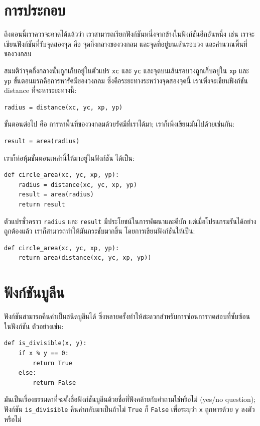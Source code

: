 \section{การประกอบ}%

ถึงตอนนี้เราควรจะคาดได้แล้วว่า เราสามารถเรียกฟังก์ชันหนึ่งจากข้างในฟังก์ชันอีกอันหนึ่ง เช่น 
เราจะเขียนฟังก์ชันที่รับจุดสองจุด คือ จุดกึ่งกลางของวงกลม และจุดที่อยู่บนเส้นรอบวง
และคำนวณพื้นที่ของวงกลม

สมมติว่าจุดกึ่งกลางนั้นถูกเก็บอยู่ในตัวแปร {\tt xc} และ {\tt yc} และจุดบนเส้นรอบวงถูกเก็บอยู่ใน
{\tt xp} และ {\tt yp} ขั้นตอนแรกคือการหารัศมีของวงกลม ซึ่งคือระยะทางระหว่างจุดสองจุดนี้
เราเพิ่งจะเขียนฟังก์ชัน distance ที่จะหาระยะทางนี้:

\begin{verbatim}
radius = distance(xc, yc, xp, yp)
\end{verbatim}
%
ขั้นตอนต่อไป คือ การหาพื้นที่ของวงกลมด้วยรัศมีที่เราได้มา; เราก็เพิ่งเขียนมันไปด้วยเช่นกัน:

\begin{verbatim}
result = area(radius)
\end{verbatim}
%
เราก็ห่อหุ้มขั้นตอนเหล่านี้ให้มาอยู่ในฟังก์ชัน ได้เป็น:

\begin{verbatim}
def circle_area(xc, yc, xp, yp):
    radius = distance(xc, yc, xp, yp)
    result = area(radius)
    return result
\end{verbatim}
%
ตัวแปรชั่วคราว {\tt radius} และ {\tt result} มีประโยชน์ในการพัฒนาและดีบัก
แต่เมื่อโปรแกรมรันได้อย่างถูกต้องแล้ว เราก็สามารถทำให้มันกระชับมากขึ้น โดยการเขียนฟังก์ชันให้เป็น:

\begin{verbatim}
def circle_area(xc, yc, xp, yp):
    return area(distance(xc, yc, xp, yp))
\end{verbatim}
%


\section{ฟังก์ชันบูลีน } %
\label{boolean}

ฟังก์ชันสามารถคืนค่าเป็นชนิดบูลีนได้ ซึ่งหลายครั้งทำให้สะดวกสำหรับการซ่อนการทดสอบที่ซับซ้อนในฟังก์ชัน
ตัวอย่างเช่น:

\begin{verbatim}
def is_divisible(x, y):
    if x % y == 0:
        return True
    else:
        return False
\end{verbatim}
%
มันเป็นเรื่องธรรมดาที่จะตั้งชื่อฟังก์ชันบูลีนด้วยชื่อที่ฟังคล้ายกับคำถามใช่หรือไม่ (yes/no
question); ฟังก์ชัน \verb"is_divisible" คืนค่ากลับมาเป็นถ้าไม่ {\tt True} ก็ {\tt False} เพื่อระบุว่า {\tt x} ถูกหารด้วย {\tt y} ลงตัวหรือไม่

